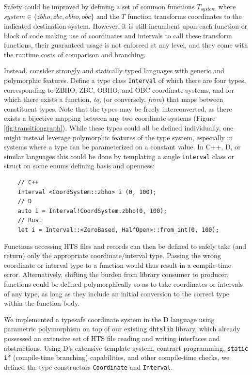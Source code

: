 \documentclass[12pt]{article}
\begin{document}
Safety could be improved by defining a set of common functions $T_{system}$ where $ system \in \{zbho, zbc, obho, obc\}$ and the $T$ function transforms coordinates to the indicated destination system. However, it is still incumbent upon each function or block of code making use of coordinates and intervals to call these transform functions, their guaranteed usage is not enforced at any level, and they come with the runtime costs of comparison and branching.

Instead, consider strongly and statically typed languages with generic and polymorphic features. Define a type class \texttt{Interval} of which there are four types, corresponding to ZBHO, ZBC, OBHO, and OBC coordinate systems, and for which there exists a function, \textit{to}, (or conversely, \textit{from}) that maps between constituent types. Note that the types may be freely interconverted, as there exists a bijective mapping between any two coordinate systems (Figure \ref{fig:transitiongraph}). While these types could all be defined individually, one might instead leverage polymorphic features of the type system, especially in systems where a type can be parameterized on a constant value. 
\filbreak
In C++, D, or similar languages this could be done by templating a single \texttt{Interval} class or struct on some enums defining basis and openness:
\begin{verbatim}
    // C++
    Interval <CoordSystem::zbho> i (0, 100);
    // D
    auto i = Interval!CoordSystem.zbho(0, 100);
    // Rust
    let i = Interval::<ZeroBased, HalfOpen>::from_int(0, 100);
\end{verbatim}

Functions accessing HTS files and records can then be defined to safely take (and return) only the appropriate coordinate/interval type. Passing the wrong coordinate or interval type to a function would thus result in a compile-time error. Alternatively, shifting the burden from library consumer to producer, functions could be defined polymorphically so as to take coordinates or intervals of any type, as long as they include an initial conversion to the correct type within the function body.


We implemented a typesafe coordinate system in the D language using parametric polymorphism on top of our existing \texttt{dhtslib}\cite{gregory_dhtslib_nodate} library, which already possessed an extensive set of HTS file reading and writing interfaces and abstractions. Using D’s extensive template system, contract programming, \texttt{static if} (compile-time branching) capabilities, and other compile-time checks, we defined the type constructors \texttt{Coordinate} and \texttt{Interval}.
\end{document}
